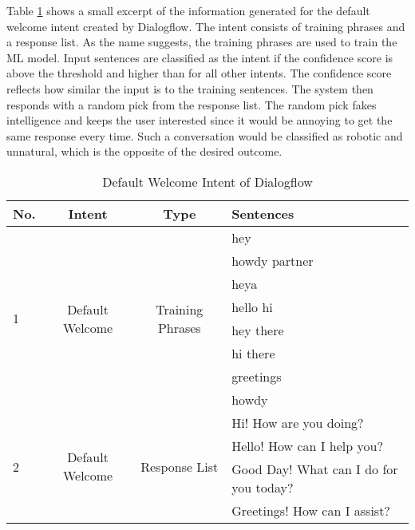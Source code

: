 Table \ref{tab:defaultwelcomedialogflow} shows a small excerpt of the information generated for the default welcome intent created by Dialogflow.
The intent consists of training phrases and a response list.
As the name suggests, the training phrases are used to train the ML model.
Input sentences are classified as the intent if the confidence score is above the threshold and higher than for all other intents.
The confidence score reflects how similar the input is to the training sentences.
The system then responds with a random pick from the response list.
The random pick fakes intelligence and keeps the user interested since it would be annoying to get the same response every time.
Such a conversation would be classified as robotic and unnatural, which is the opposite of the desired outcome.

\begin{table}[H]
    \centering
    \begin{tabular}{ l | c | c | l }
  No. & Intent & Type & Sentences \\ \hline \hline
  \multirow{8}{*}{1}
  & \multirow{8}{*}{Default Welcome} & \multirow{8}{*}{Training Phrases} & hey \\
      & & & howdy partner\\
      & & & heya\\ 
      & & & hello hi\\ 
      & & & hey there\\ 
      & & & hi there\\ 
      & & & greetings\\ 
      & & & howdy \\ \hline
  \multirow{4}{*}{2}
  & \multirow{4}{*}{Default Welcome} & \multirow{4}{*}{Response List} & Hi! How are you doing? \\
      & & & Hello! How can I help you?\\
      & & & Good Day! What can I do for you today?\\ 
      & & & Greetings! How can I assist?\\ \hline
\end{tabular}
    \caption{Default Welcome Intent of Dialogflow} \label{tab:defaultwelcomedialogflow}
\end{table} \noindent



